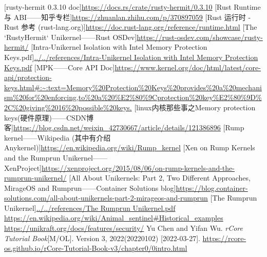 \documentclass[UTF8,fontset=none,linespread=1.15]{ctexart}
\begin{document}
\begin{thebibliography}{99}
 [rusty-hermit 0.3.10 doc]\url{https://docs.rs/crate/rusty-hermit/0.3.10}
 [Rust Runtime 与 ABI——知乎专栏]\url{https://zhuanlan.zhihu.com/p/370897059}
 [Rust 运行时 - Rust 参考 (rust-lang.org)]\url{https://doc.rust-lang.org/reference/runtime.html}
 [The `RustyHermit` Unikernel——Rust OSDev]\url{https://rust-osdev.com/showcase/rusty-hermit/}
 [Intra-Unikernel Isolation with Intel Memory Protection Keys.pdf]\url{../../references/Intra-Unikernel Isolation with Intel Memory Protection Keys.pdf}
 [MPK——Core API Doc]\url{https://www.kernel.org/doc/html/latest/core-api/protection-keys.html#:~:text=Memory%20Protection%20Keys%20provides%20a%20mechanism%20for%20enforcing,to%20a%20%E2%80%9Cprotection%20key%E2%80%9D%2C%20giving%2016%20possible%20keys.}
 [linux内核那些事之Memory protection keys(硬件原理)——CSDN博客]\url{https://blog.csdn.net/weixin_42730667/article/details/121386896}
 [Rump kernel——Wikipedia (其中有介绍 Anykernel)]\url{https://en.wikipedia.org/wiki/Rump_kernel}
 [Xen on Rump Kernels and the Rumprun Unikernel——XenProject]\url{https://xenproject.org/2015/08/06/on-rump-kernels-and-the-rumprun-unikernel/}
 [All About Unikernels: Part 2, Two Different Approaches, MirageOS and Rumprun——Container Solutions blog]\url{https://blog.container-solutions.com/all-about-unikernels-part-2-mirageos-and-rumprun}
 [The Rumprun Unikernel]\url{../../references/The Rumprun Unikernel.pdf}
 \url{https://en.wikipedia.org/wiki/Animal_sentinel#Historical_examples}
 \url{https://unikraft.org/docs/features/security/}
 Yu Chen and Yifan Wu. \textit{rCore Tutorial Book}[M/OL]. Version 3,
2022(20220102) [2022-03-27]. \url{https://rcore-os.github.io/rCore-Tutorial-Book-v3/chapter0/0intro.html}
\end{thebibliography}
\end{document}
